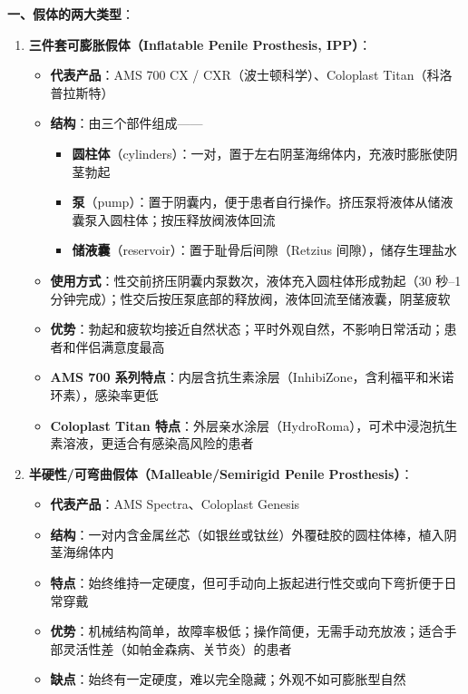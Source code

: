 \vspace{0.5em}
\noindent\textbf{一、假体的两大类型}：

\begin{enumerate}
	\item \textbf{三件套可膨胀假体（Inflatable Penile Prosthesis, IPP）}：
	\begin{itemize}
		\item \textbf{代表产品}：AMS 700 CX / CXR（波士顿科学）、Coloplast Titan（科洛普拉斯特）
		\item \textbf{结构}：由三个部件组成——
		\begin{itemize}
			\item \textbf{圆柱体}（cylinders）：一对，置于左右阴茎海绵体内，充液时膨胀使阴茎勃起
			\item \textbf{泵}（pump）：置于阴囊内，便于患者自行操作。挤压泵将液体从储液囊泵入圆柱体；按压释放阀液体回流
			\item \textbf{储液囊}（reservoir）：置于耻骨后间隙（Retzius 间隙），储存生理盐水
		\end{itemize}
		\item \textbf{使用方式}：性交前挤压阴囊内泵数次，液体充入圆柱体形成勃起（30 秒--1 分钟完成）；性交后按压泵底部的释放阀，液体回流至储液囊，阴茎疲软
		\item \textbf{优势}：勃起和疲软均接近自然状态；平时外观自然，不影响日常活动；患者和伴侣满意度最高
		\item \textbf{AMS 700 系列特点}：内层含抗生素涂层（InhibiZone，含利福平和米诺环素），感染率更低
		\item \textbf{Coloplast Titan 特点}：外层亲水涂层（HydroRoma），可术中浸泡抗生素溶液，更适合有感染高风险的患者
	\end{itemize}

	\item \textbf{半硬性/可弯曲假体（Malleable/Semirigid Penile Prosthesis）}：
	\begin{itemize}
		\item \textbf{代表产品}：AMS Spectra、Coloplast Genesis
		\item \textbf{结构}：一对内含金属丝芯（如银丝或钛丝）外覆硅胶的圆柱体棒，植入阴茎海绵体内
		\item \textbf{特点}：始终维持一定硬度，但可手动向上扳起进行性交或向下弯折便于日常穿戴
		\item \textbf{优势}：机械结构简单，故障率极低；操作简便，无需手动充放液；适合手部灵活性差（如帕金森病、关节炎）的患者
		\item \textbf{缺点}：始终有一定硬度，难以完全隐藏；外观不如可膨胀型自然
	\end{itemize}
\end{enumerate}

